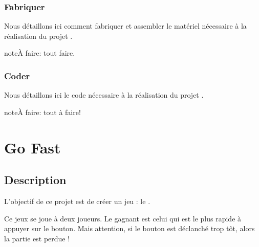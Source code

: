 \documentclass[letterpaper,10pt,french]{sphinxmanual}
\begin{document}
\subsubsection{Fabriquer}
\label{\detokenize{projets/pierrot-fabriquer::doc}}\label{\detokenize{projets/pierrot-fabriquer:fabriquer}}
Nous détaillons ici comment fabriquer et assembler
le matériel nécessaire à la réalisation du projet
.

\begin{sphinxadmonition}{note}{\label{projets/pierrot-fabriquer:index-0}À faire:}
tout faire.
\end{sphinxadmonition}

\ignorespaces 

\subsubsection{Coder}
\label{\detokenize{projets/pierrot-coder:index-0}}\label{\detokenize{projets/pierrot-coder:coder}}\label{\detokenize{projets/pierrot-coder::doc}}
Nous détaillons ici le code nécessaire à la réalisation
du projet .

\begin{sphinxadmonition}{note}{\label{projets/pierrot-coder:index-1}À faire:}
tout à faire!
\end{sphinxadmonition}


\section{Go Fast}
\label{\detokenize{projets/goFast::doc}}\label{\detokenize{projets/goFast:go-fast}}\label{\detokenize{projets/goFast:projetgofast}}

\subsection{Description}
\label{\detokenize{projets/goFast:description}}
L’objectif de ce projet est de créer un jeu : le .

Ce jeux se joue à deux joueurs. Le gagnant est celui qui est le plus
rapide à appuyer sur le bouton. Mais attention, si le bouton est
déclanché trop tôt, alors la partie est perdue !
\begin{quote}

\noindent{}
\end{quote}
\end{document}
